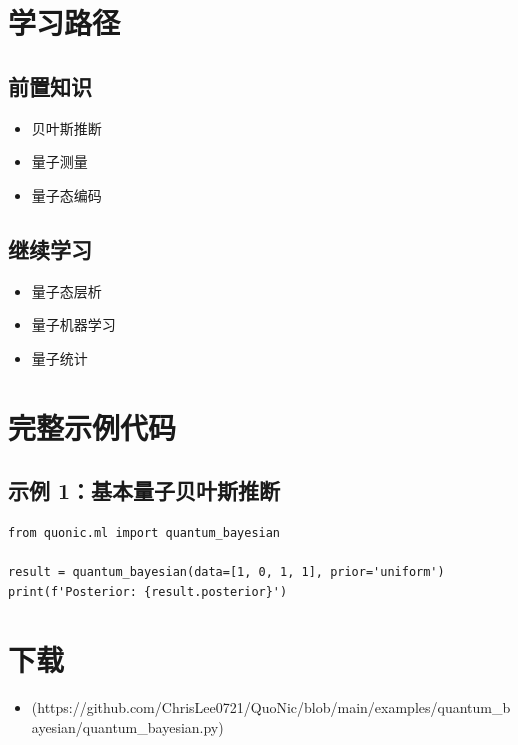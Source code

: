 \documentclass[12pt,a4paper]{article}
\begin{document}
\section{学习路径}

\subsection{前置知识}
\begin{itemize}
  \item 贝叶斯推断
  \item 量子测量
  \item 量子态编码
\end{itemize}

\subsection{继续学习}
\begin{itemize}
  \item 量子态层析
  \item 量子机器学习
  \item 量子统计
\end{itemize}

\section{完整示例代码}

\subsection{示例 1：基本量子贝叶斯推断}

\begin{verbatim}
from quonic.ml import quantum_bayesian

result = quantum_bayesian(data=[1, 0, 1, 1], prior='uniform')
print(f'Posterior: {result.posterior}')
\end{verbatim}

\section{下载}

\begin{itemize}
  \item [quantum\_bayesian.py](https://github.com/ChrisLee0721/QuoNic/blob/main/examples/quantum_bayesian/quantum_bayesian.py)
\end{itemize}
\end{document}
